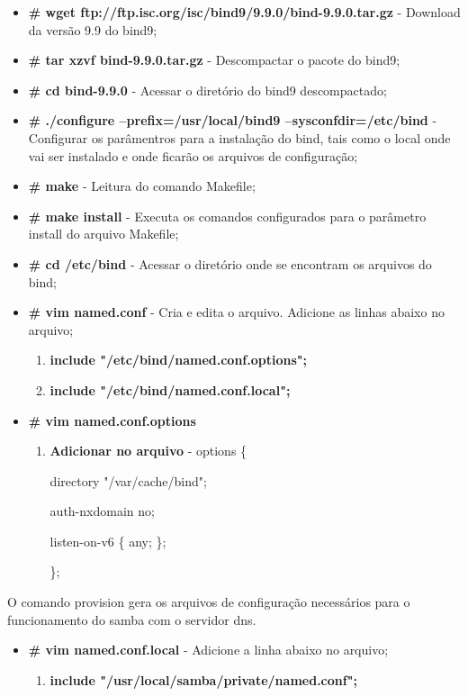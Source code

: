 \begin{itemize}
	\item \textbf{\# wget ftp://ftp.isc.org/isc/bind9/9.9.0/bind-9.9.0.tar.gz} - Download da versão 9.9 do bind9;
	\item \textbf{\# tar xzvf bind-9.9.0.tar.gz} - Descompactar o pacote do bind9;
	\item \textbf{\# cd bind-9.9.0} - Acessar o diretório do bind9 descompactado;
	\item \textbf{\# ./configure --prefix=/usr/local/bind9 --sysconfdir=/etc/bind} - Configurar os parâmentros para a instalação do bind, tais como o local onde vai ser instalado e onde ficarão os arquivos de configuração;
	\item \textbf{\# make} - Leitura do comando Makefile;
	\item \textbf{\# make install} - Executa os comandos configurados para o parâmetro install do arquivo Makefile;
	\item \textbf{\# cd /etc/bind} - Acessar o diretório onde se encontram os arquivos do bind;
	\item \textbf{\# vim named.conf} - Cria e edita o arquivo. Adicione as linhas abaixo no arquivo;
		\begin{enumerate}
			\item \textbf{include "/etc/bind/named.conf.options";}
			\item \textbf{include "/etc/bind/named.conf.local";}
		\end{enumerate}
 		\item \textbf{\# vim named.conf.options}
			\begin{enumerate}
				\item \textbf{Adicionar no arquivo} - options \{
        			
					directory "/var/cache/bind";

					auth-nxdomain no;

					listen-on-v6 \{ any; \};
					
					\};
			\end{enumerate}
\end{itemize}

O comando provision gera os arquivos de configuração necessários para o funcionamento do samba com o servidor dns.

\begin{itemize}
	\item \textbf{\# vim named.conf.local} -  Adicione a linha abaixo no arquivo;
		\begin{enumerate}
			\item \textbf{include "/usr/local/samba/private/named.conf";}
		\end{enumerate}
\end{itemize}

